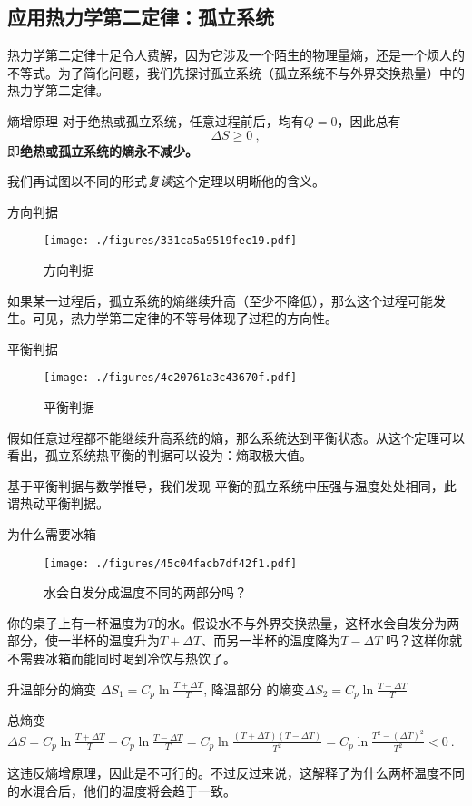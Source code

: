 \subsection{应用热力学第二定律：孤立系统}
热力学第二定律十足令人费解，因为它涉及一个陌生的物理量熵，还是一个烦人的不等式。为了简化问题，我们先探讨孤立系统（孤立系统不与外界交换热量）中的热力学第二定律。
\begin{corollary}{熵增原理}
对于绝热或孤立系统，任意过程前后，均有$Q=0$，因此总有 $$\Delta S \ge 0~,$$
即\textbf{绝热或孤立系统的熵永不减少。}
\end{corollary}
我们再试图以不同的形式\textsl{复读}这个定理以明晰他的含义。

\begin{corollary}{方向判据}
\begin{figure}[ht]
\centering
\texttt{[image: ./figures/331ca5a9519fec19.pdf]}
\caption{方向判据} \label{fig_Td2Law_1}
\end{figure}
如果某一过程后，孤立系统的熵继续升高（至少不降低），那么这个过程可能发生。可见，热力学第二定律的不等号体现了过程的方向性。
\end{corollary}

\begin{corollary}{平衡判据}
\begin{figure}[ht]
\centering
\texttt{[image: ./figures/4c20761a3c43670f.pdf]}
\caption{平衡判据} \label{fig_Td2Law_2}
\end{figure}
假如任意过程都不能继续升高系统的熵，那么系统达到平衡状态。从这个定理可以看出，孤立系统热平衡的判据可以设为：熵取极大值。

基于平衡判据与数学推导，我们发现 平衡的孤立系统中压强与温度处处相同，此谓热动平衡判据。
\end{corollary}

\begin{example}{为什么需要冰箱}
\begin{figure}[ht]
\centering
\texttt{[image: ./figures/45c04facb7df42f1.pdf]}
\caption{水会自发分成温度不同的两部分吗？} \label{fig_Td2Law_5}
\end{figure}
你的桌子上有一杯温度为$T$的水。假设水不与外界交换热量，这杯水会自发分为两部分，使一半杯的温度升为$T+\Delta T$、而另一半杯的温度降为$T-\Delta T$ 吗？这样你就不需要冰箱而能同时喝到冷饮与热饮了。

升温部分的熵变 $\Delta S_1=C_p \ln \frac{T+\Delta T}{T}$, 降温部分 的熵变$\Delta S_2=C_p \ln \frac{T-\Delta T}{T}$

总熵变 $\Delta S = C_p \ln \frac{T+\Delta T}{T} + C_p \ln \frac{T-\Delta T}{T} = C_p \ln \frac{(T+\Delta T)(T-\Delta T)}{T^2}= C_p \ln \frac{T^2 - (\Delta T)^2}{T^2}<0~.$

这违反熵增原理，因此是不可行的。不过反过来说，这解释了为什么两杯温度不同的水混合后，他们的温度将会趋于一致。
\end{example}

